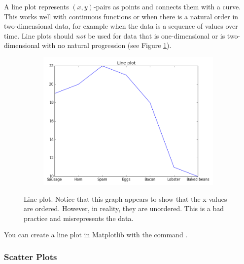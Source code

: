 A line plot represents $(x,y)$-pairs as points and connects them with a curve. 
This works well with continuous functions or when there is a natural order in two-dimensional data, for example when the data is a sequence of values over time.
Line plots should \emph{not} be used for data that is one-dimensional or is two-dimensional with no natural
progression (see Figure \ref{fig:lineplotbadX}). %

\begin{figure}[H]
\centering
\begin{subfigure}{.5\textwidth}
\centering
\includegraphics[width=\textwidth]{line_plot_bad_X.png}
\end{subfigure}
\caption{Line plot.  Notice that this graph appears to show that the x-values are ordered.  However, in reality, they are unordered.  This is a bad practice and misrepresents the data.}
\label{fig:lineplotbadX}
\end{figure}

You can create a line plot in Matplotlib with the command .

\newpage

\subsubsection*{Scatter Plots} %

